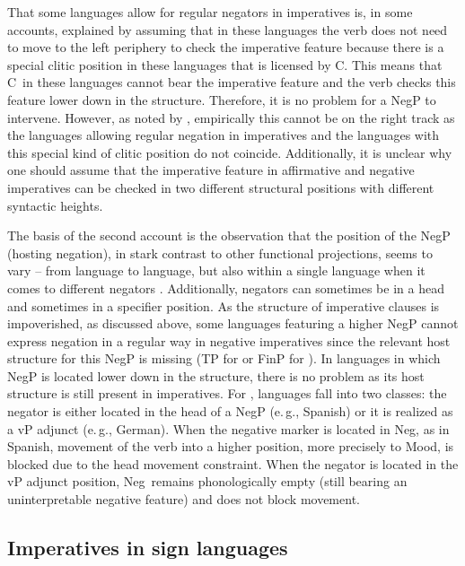 That some languages allow for regular negators in imperatives is, in some accounts, explained by assuming that in these languages the verb does not need to move to the left periphery to check the imperative feature because there is a special clitic position in these languages that is licensed by C\textdegree . This means that C\textdegree\ in these languages cannot bear the imperative feature and the verb checks this feature lower down in the structure. Therefore, it is no problem for a NegP to intervene. However, as noted by \citet[62]{van2007imperatives}, empirically this cannot be on the right track as the languages allowing regular negation in imperatives and the languages with this special kind of clitic position do not coincide. Additionally, it is unclear why one should assume that the imperative feature in affirmative and negative imperatives can be checked in two different structural positions with different syntactic heights. 

The basis of the second account is the observation that the position of the NegP (hosting negation), in stark contrast to other functional projections, seems to vary -- from language to language, but also within a single language when it comes to different negators \citep{ouhalla1990sentential, ouhalla1991functional, zanuttini1991syntactic}. Additionally, negators can sometimes be in a head and sometimes in a specifier position. As the structure of imperative clauses is impoverished, as discussed above, some languages featuring a higher NegP cannot express negation in a regular way in negative imperatives since the relevant host structure for this NegP is missing (TP for \citealt{zanuttini1991syntactic} or FinP for \citealt{platzack1998subject}). In languages in which NegP is located lower down in the structure, there is no problem as its host structure is still present in imperatives. For \citet{zeijlstra2004sentential}, languages fall into two classes: the negator is either located in the head of a NegP (e.\,g., Spanish) or it is realized as a vP adjunct (e.\,g., German). When the negative marker is located in Neg\textdegree , as in Spanish, movement of the verb into a higher position, more precisely to Mood\textdegree , is blocked due to the head movement constraint. When the negator is located in the vP adjunct position, Neg\textdegree\ remains phonologically empty (still bearing an uninterpretable negative feature) and does not block movement. 

\subsection{Imperatives in sign languages}

